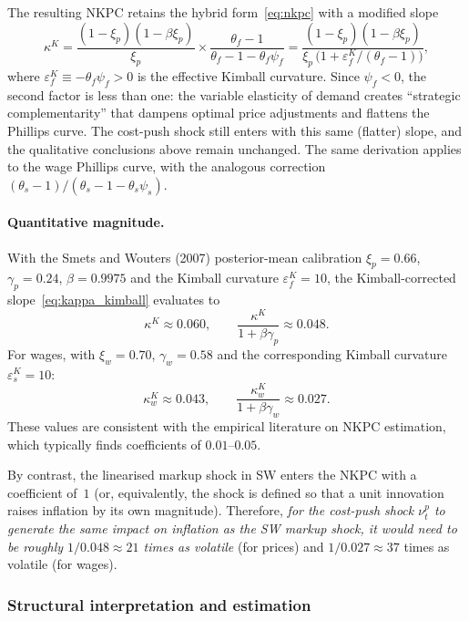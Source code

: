\documentclass[11pt,a4paper]{article}
\begin{document}
The resulting NKPC retains the hybrid form~\eqref{eq:nkpc} with a
modified slope
\begin{equation}\label{eq:kappa_kimball}
  \kappa^K
  = \frac{(1-\xi_p)(1-\beta\xi_p)}{\xi_p}
  \times \frac{\theta_f-1}{\theta_f-1-\theta_f\psi_f}
  = \frac{(1-\xi_p)(1-\beta\xi_p)}
    {\xi_p\,\bigl(1 + \varepsilon^K_f/(\theta_f-1)\bigr)},
\end{equation}
where $\varepsilon^K_f \equiv -\theta_f\psi_f > 0$ is the
effective Kimball curvature.  Since $\psi_f < 0$, the second factor
is less than one: the variable elasticity of demand creates
``strategic complementarity'' that dampens optimal price adjustments
and flattens the Phillips curve.  The cost-push shock still enters
with this same (flatter) slope, and the qualitative conclusions above
remain unchanged.  The same derivation
applies to the wage Phillips curve, with the analogous correction
$(\theta_s-1)/(\theta_s-1-\theta_s\psi_s)$.

\paragraph{Quantitative magnitude.}
With the Smets and Wouters (2007) posterior-mean calibration $\xi_p = 0.66$,
$\gamma_p = 0.24$, $\beta = 0.9975$ and the Kimball curvature
$\varepsilon^K_f = 10$, the
Kimball-corrected slope~\eqref{eq:kappa_kimball} evaluates to
\[
  \kappa^K \approx 0.060,
  \qquad
  \frac{\kappa^K}{1 + \beta\gamma_p}
  \approx 0.048.
\]
For wages, with $\xi_w = 0.70$, $\gamma_w = 0.58$ and the corresponding Kimball
curvature $\varepsilon^K_s = 10$:
\[
  \kappa^K_w \approx 0.043,
  \qquad
  \frac{\kappa^K_w}{1 + \beta\gamma_w}
  \approx 0.027.
\]
These values are consistent with the empirical literature on NKPC
estimation, which typically finds coefficients of $0.01$--$0.05$.

By contrast, the linearised markup shock in SW enters the NKPC with a
coefficient of~$1$ (or, equivalently, the shock is defined so that a
unit innovation raises inflation by its own magnitude).  Therefore,
\emph{for the cost-push shock $\nu^p_t$ to generate the same impact on
inflation as the SW markup shock, it would need to be roughly
$1/0.048 \approx 21$ times as volatile} (for prices) and
$1/0.027 \approx 37$ times as volatile (for wages).

\subsubsection{Structural interpretation and estimation}
\label{sec:mc_shock}
\end{document}
